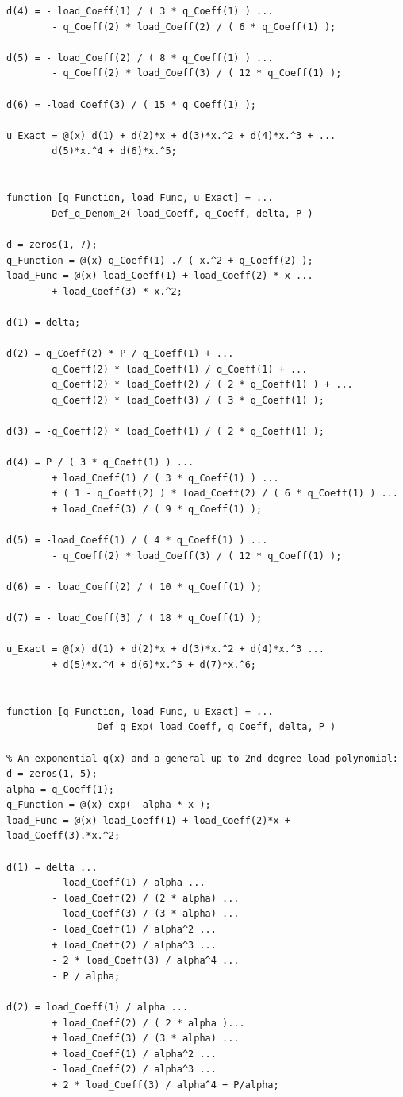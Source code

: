 \begin{lstlisting}[caption = {Define the Problem and Its Analytical Solution}, label = lst:Def_Problem]
d(4) = - load_Coeff(1) / ( 3 * q_Coeff(1) ) ...
		- q_Coeff(2) * load_Coeff(2) / ( 6 * q_Coeff(1) );

d(5) = - load_Coeff(2) / ( 8 * q_Coeff(1) ) ...
		- q_Coeff(2) * load_Coeff(3) / ( 12 * q_Coeff(1) );

d(6) = -load_Coeff(3) / ( 15 * q_Coeff(1) );

u_Exact = @(x) d(1) + d(2)*x + d(3)*x.^2 + d(4)*x.^3 + ...
		d(5)*x.^4 + d(6)*x.^5;


function [q_Function, load_Func, u_Exact] = ...
		Def_q_Denom_2( load_Coeff, q_Coeff, delta, P )
		
d = zeros(1, 7);
q_Function = @(x) q_Coeff(1) ./ ( x.^2 + q_Coeff(2) );    
load_Func = @(x) load_Coeff(1) + load_Coeff(2) * x ...
		+ load_Coeff(3) * x.^2;

d(1) = delta;

d(2) = q_Coeff(2) * P / q_Coeff(1) + ...
		q_Coeff(2) * load_Coeff(1) / q_Coeff(1) + ...
		q_Coeff(2) * load_Coeff(2) / ( 2 * q_Coeff(1) ) + ...
		q_Coeff(2) * load_Coeff(3) / ( 3 * q_Coeff(1) );

d(3) = -q_Coeff(2) * load_Coeff(1) / ( 2 * q_Coeff(1) );

d(4) = P / ( 3 * q_Coeff(1) ) ...
		+ load_Coeff(1) / ( 3 * q_Coeff(1) ) ...
		+ ( 1 - q_Coeff(2) ) * load_Coeff(2) / ( 6 * q_Coeff(1) ) ...
		+ load_Coeff(3) / ( 9 * q_Coeff(1) );

d(5) = -load_Coeff(1) / ( 4 * q_Coeff(1) ) ...
		- q_Coeff(2) * load_Coeff(3) / ( 12 * q_Coeff(1) );

d(6) = - load_Coeff(2) / ( 10 * q_Coeff(1) ); 

d(7) = - load_Coeff(3) / ( 18 * q_Coeff(1) );

u_Exact = @(x) d(1) + d(2)*x + d(3)*x.^2 + d(4)*x.^3 ...
		+ d(5)*x.^4 + d(6)*x.^5 + d(7)*x.^6;


function [q_Function, load_Func, u_Exact] = ...
				Def_q_Exp( load_Coeff, q_Coeff, delta, P )

% An exponential q(x) and a general up to 2nd degree load polynomial:
d = zeros(1, 5);
alpha = q_Coeff(1);
q_Function = @(x) exp( -alpha * x );
load_Func = @(x) load_Coeff(1) + load_Coeff(2)*x + load_Coeff(3).*x.^2;

d(1) = delta ...
		- load_Coeff(1) / alpha ...
		- load_Coeff(2) / (2 * alpha) ...
		- load_Coeff(3) / (3 * alpha) ...
		- load_Coeff(1) / alpha^2 ...
		+ load_Coeff(2) / alpha^3 ...
		- 2 * load_Coeff(3) / alpha^4 ...
		- P / alpha;

d(2) = load_Coeff(1) / alpha ...
		+ load_Coeff(2) / ( 2 * alpha )...
		+ load_Coeff(3) / (3 * alpha) ...
		+ load_Coeff(1) / alpha^2 ...
		- load_Coeff(2) / alpha^3 ...
		+ 2 * load_Coeff(3) / alpha^4 + P/alpha;


\end{lstlisting}
